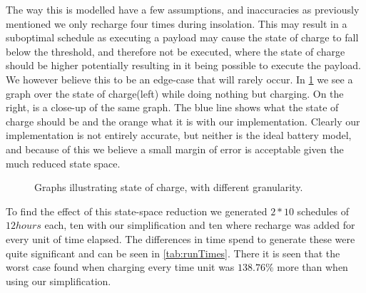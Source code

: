 The way this is modelled have a few assumptions, and inaccuracies as previously mentioned we only recharge four times during insolation. This may result in a suboptimal schedule as executing a payload may cause the state of charge to fall below the threshold, and therefore not be executed, where the state of charge should be higher potentially resulting in it being possible to execute the payload. We however believe this to be an edge-case that will rarely occur.
In \cref{fig:granularity} we see a graph over the state of charge(left) while doing nothing but charging. On the right, is a close-up of the same graph. The blue line shows what the state of charge should be and the orange what it is with our implementation. Clearly our implementation is not entirely accurate, but neither is the ideal battery model, and because of this we believe a small margin of error is acceptable given the much reduced state space.

\begin{figure}[H]%
	\centering
	\qquad
	\caption{Graphs illustrating state of charge, with different granularity.}%
	\label{fig:granularity}%
\end{figure}

To find the effect of this state-space reduction we generated $2 * 10$ schedules of $12hours$ each, ten with our simplification and ten where recharge was added for every unit of time elapsed. The differences in time spend to generate these were quite significant and can be seen in \cref{tab:runTimes}. There it is seen that the worst case found when charging every time unit was $138.76\%$ more than when using our simplification.

